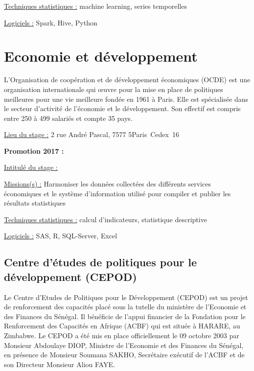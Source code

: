 \documentclass[
  letterpaper,
  DIV=11,
  numbers=noendperiod]{scrreprt}
\begin{document}
\uline{Techniques statistiques :} machine learning, series temporelles

\uline{Logiciels :} Spark, Hive, Python


\hypertarget{economie-et-duxe9veloppement}{%
\chapter{Economie et développement}\label{economie-et-duxe9veloppement}}

L'Organisation de coopération et de développement économiques (OCDE) est
une organisation internationale qui œuvre pour la mise en place de
politiques meilleures pour une vie meilleure fondée en 1961 à Paris.
Elle est spécialisée dans le secteur d'activité de l'économie et le
développement. Son effectif est compris entre 250 à 499 salariés et
compte 35 pays.

\uline{Lieu du stage :} 2 rue André Pascal, 7577 5Paris~Cedex~16

\textbf{Promotion 2017 :}

\uline{Intitulé du stage :}

\uline{Missions(s) :} Harmoniser les données collectées des différents
services économiques et le système d'information utilisé pour compiler
et publier les résultats statistiques

\uline{Techniques statistiques :} calcul d'indicateurs, statistique
descriptive

\uline{Logiciels :} SAS, R, SQL-Server, Excel

\hypertarget{centre-duxe9tudes-de-politiques-pour-le-duxe9veloppement-cepod}{%
\section{\texorpdfstring{\textbf{Centre d'études de politiques pour le
développement
(CEPOD)}}{Centre d'études de politiques pour le développement (CEPOD)}}\label{centre-duxe9tudes-de-politiques-pour-le-duxe9veloppement-cepod}}

Le Centre d'Etudes de Politiques pour le Développement (CEPOD) est un
projet de renforcement des capacités placé sous la tutelle du ministère
de l'Economie et des Finances du Sénégal. Il bénéficie de l'appui
financier de la Fondation pour le Renforcement des Capacités en Afrique
(ACBF) qui est située à HARARE, au Zimbabwe. Le CEPOD a été mis en place
officiellement le 09 octobre 2003 par Monsieur Abdoulaye DIOP, Ministre
de l'Economie et des Finances du Sénégal, en présence de Monsieur
Soumana SAKHO, Secrétaire exécutif de l'ACBF et de son Directeur
Monsieur Aliou FAYE.
\end{document}
